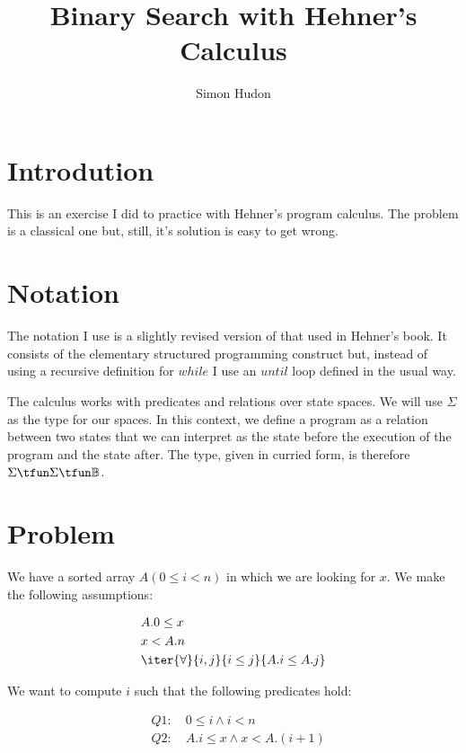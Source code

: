 \documentclass[11pt]{amsart}
\title{Binary Search with Hehner's Calculus}
\author{Simon Hudon}
\date{}                                           %
\begin{document}
\maketitle

\section{Introdution}

This is an exercise I did to practice with Hehner's program calculus.  The problem is a classical one but, still, it's solution is easy to get wrong.

\section{Notation}

The notation I use is a slightly revised version of that used in Hehner's book.  It consists of the elementary structured programming construct but, instead of using a recursive definition for $while$ I use an $until$ loop defined in the usual way.  

The calculus works with predicates and relations over state spaces.  We will use $\Sigma$ as the type for our spaces.  In this context, we define a program as a relation between two states that we can interpret as the state before the execution of the program and the state after.  The type, given in curried form, is therefore $\Sigma \tfun \Sigma \tfun \mathbb{B}$. 


\section{Problem}

We have a sorted array $A(0 \le i<n)$ in which we are looking for $x$.  We make the following assumptions:

\begin{align} 
	& A.0 \le x \\
	& x < A.n \\
	& \iter{\forall}{i,j}{i \le j}{A.i \le A.j}
\end{align}

We want to compute $i$ such that the following predicates hold:

\begin{align*}
	& Q1: \quad 0 \le i \land i < n \\
	& Q2: \quad A.i \le x \land x < A.(i+1)
\end{align*}
\end{document}
